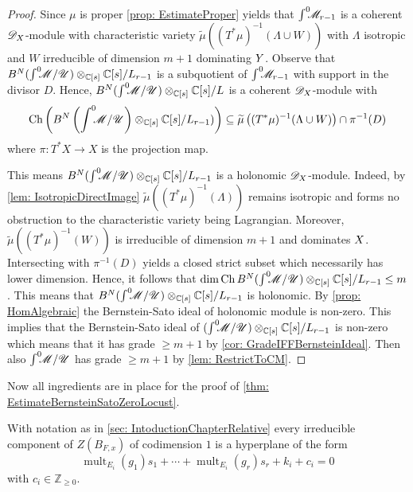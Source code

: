 \begin{proof}
  Since $\mu$ is proper \cref{prop: EstimateProper} yields that $\int^0 \mkern -8mu \mathscr{M}_{r-1}$ is a coherent $\mathscr{D}_X$-module with characteristic variety $\widetilde{\mu}((T^*\mu)^{-1}(\Lambda\cup W))$ with $\Lambda$ isotropic and $W$ irreducible of dimension $m+1$ dominating $Y$.
  Observe that $B^N(\int^0 \mkern -8mu\mathscr{M}/ \mathscr{U})\otimes_{\mathbb{C}[s]}\mathbb{C}[s]/L_{r-1}$ is a subquotient of $\int^0 \mkern -8mu\mathscr{M}_{r-1}$ with support in the divisor $D$.
  Hence, $B^N(\int^0 \mkern -8mu\mathscr{M}/ \mathscr{U})\otimes_{\mathbb{C}[s]}\mathbb{C}[s]/L$ is a coherent $\mathscr{D}_X$-module with
  $$\operatorname{Ch}\left( B^N\left(\int^0 \mkern -8mu\mathscr{M}/ \mathscr{U}\right)\otimes_{\mathbb{C}[s]}\mathbb{C}[s]/L_{r-1}) \right)\subseteq  \widetilde{\mu}\left((T^*\mu)^{-1}(\Lambda\cup W)\right) \cap \pi^{-1}(D)$$
  where $\pi:T^*X\to X$ is the projection map.

  This means $B^N(\int^0 \mkern -8mu\mathscr{M}/ \mathscr{U})\otimes_{\mathbb{C}[s]}\mathbb{C}[s]/L_{r-1}$ is a holonomic $\mathscr{D}_X$-module.
  Indeed, by \cref{lem: IsotropicDirectImage} $\widetilde{\mu}((T^*\mu)^{-1}(\Lambda))$ remains isotropic and forms no obstruction to the characteristic variety being Lagrangian.
  Moreover, $\widetilde{\mu}((T^*\mu)^{-1}(W))$ is irreducible of dimension $m+1$ and dominates $X$.
  Intersecting with $\pi^{-1}(D)$ yields a closed strict subset which necessarily has lower dimension.
  Hence, it follows that $\dim \operatorname{Ch} B^N (\int^0 \mkern -8mu\mathscr{M}/ \mathscr{U})\otimes_{\mathbb{C}[s]}\mathbb{C}[s]/L_{r-1} \leq m$.
  This means that $B^N(\int^0 \mkern -8mu\mathscr{M}/ \mathscr{U})\otimes_{\mathbb{C}[s]}\mathbb{C}[s]/L_{r-1}$ is holonomic.
  By \cref{prop: HomAlgebraic} the Bernstein-Sato ideal of holonomic module is non-zero.
  This implies that the Bernstein-Sato ideal of $(\int^0 \mkern -8mu\mathscr{M}/ \mathscr{U})\otimes_{\mathbb{C}[s]}\mathbb{C}[s]/L_{r-1}$ is non-zero which means that it has grade $\geq m+1$ by \cref{cor: GradeIFFBernsteinIdeal}.
  Then also $\int^0 \mkern -8mu\mathscr{M}/\mathscr{U}$ has grade $\geq m+1$ by \cref{lem: RestrictToCM}.
  \end{proof}
Now all ingredients are in place for the proof of \cref{thm: EstimateBernsteinSatoZeroLocust}.
\begin{theorem}
  With notation as in \cref{sec: IntoductionChapterRelative} every irreducible component of $Z(B_{F,x})$ of codimension $1$ is a hyperplane of the form
  $$\operatorname{mult}_{E_i}(g_1) s_1 + \cdots + \operatorname{mult}_{E_i}(g_r)s_r + k_i + c_i=0$$
  with $c_i \in \mathbb{Z}_{\geq 0 }$.
\end{theorem}
